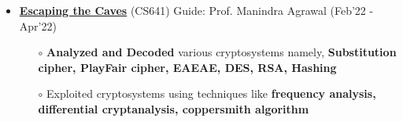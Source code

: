 \documentclass[10.8pt, a4paper]{extarticle}
\begin{document}
\begin{itemize}
\item \href{https://github.com/jeetsarangi/Modern-Cryptology}{\textbf{Escaping the Caves}} (CS641) Guide: Prof. Manindra Agrawal \hfill(Feb'22 - Apr'22)
    \\[-0.6cm]
	\begin{itemize}
	      \item [$\circ$] \textbf {Analyzed and Decoded} various cryptosystems namely, \textbf {Substitution cipher, PlayFair cipher, EAEAE,  DES, RSA, Hashing}\\[-0.6cm]
	      
	      \item [$\circ$] Exploited cryptosystems using techniques like \textbf {frequency analysis, differential cryptanalysis, coppersmith algorithm}\\[-0.6cm]
	      
	\end{itemize}



	      


\medskip

\end{itemize}
\vspace{-2mm}
\end{document}
